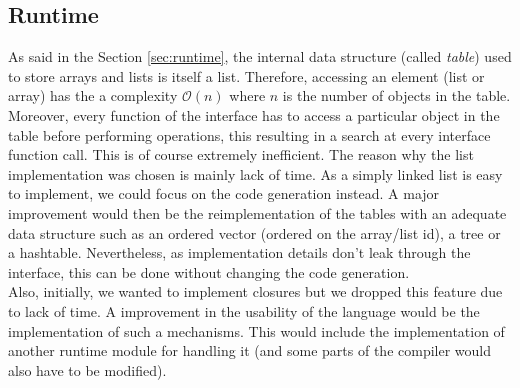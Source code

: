 \documentclass[a4paper,11pt]{article}
\begin{document}
\subsection{Runtime}
\label{ssec:flaws_runtime}
As said in the Section \ref{sec:runtime}, the internal data structure (called \textit{table}) used to store arrays and lists is itself a list. Therefore, accessing an element (list or array) has the a complexity $\mathcal{O}(n)$ where $n$ is the number of objects in the table. Moreover, every function of the interface has to access a particular object in the table before performing operations, this resulting in a search at every interface function call. This is of course extremely inefficient. The reason why the list implementation was chosen is mainly lack of time. As a simply linked list is easy to implement, we could focus on the code generation instead. A major improvement would then be the reimplementation of the tables with an adequate data structure such as an ordered vector (ordered on the array/list id), a tree or a hashtable. Nevertheless, as implementation details don't leak through the interface, this can be done without changing the code generation.
\\
Also, initially, we wanted to implement closures but we dropped this feature due to lack of time. A improvement in the usability of the language would be the implementation of such a mechanisms. This would include the implementation of another runtime module for handling it (and some parts of the compiler would also have to be modified).
\appendix
\end{document}
